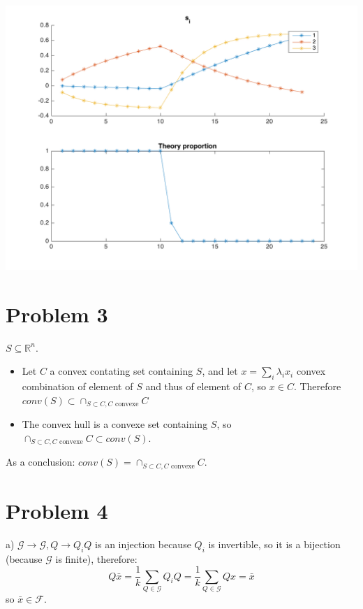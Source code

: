 \documentclass[11pt]{article}
\begin{document}
\begin{center}
\includegraphics[width=.9\linewidth]{./img/plan4.png}
\end{center}


\section{Problem 3}
\label{sec:orgheadline4}
\(S \subseteq \mathbb R^n\).

\begin{itemize}
\item Let \(C\) a convex contating set containing \(S\), and let \(x = \sum_i \lambda_i x_i\) convex combination of element of \(S\) and thus of element of \(C\), so \(x \in C\). Therefore \(conv(S) \subset \cap_{S \subset C, C \text{ convexe}} C\)

\item The convex hull is a convexe set containing \(S\), so \(\cap_{S \subset C, C \text{ convexe}} C \subset  conv(S)\).
\end{itemize}

As a conclusion: \(conv(S) = \cap_{S \subset C, C \text{ convexe}} C\).


\section{Problem 4}
\label{sec:orgheadline5}
a)
\(\mathcal G \rightarrow \mathcal G, Q \rightarrow Q_iQ\)  is an injection because \(Q_i\) is invertible, so it is a bijection (because \(\mathcal G\) is finite), therefore:
$$Q\bar x = \frac1k \sum_{Q \in \mathcal G} Q_iQ = \frac1k \sum_{Q \in \mathcal G} Qx = \bar x$$
so \(\bar x \in \mathcal F\).
\end{document}
